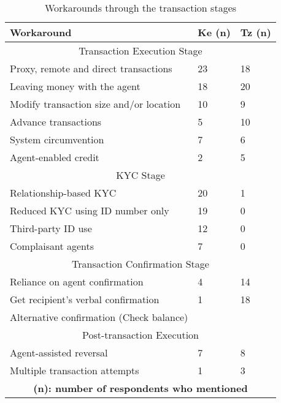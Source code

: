 \begin {table} [htbp]
\caption{Workarounds through the transaction stages}
\centering
\begin {tabular} {|l|l|l|}
\hline
\textbf{Workaround}& \textbf{Ke (n)}& \textbf{Tz (n)}\\
 \hline
 \hline
\multicolumn{3}{|c|}{Transaction Execution Stage}\\
\hline
Proxy, remote and direct transactions& 23& 18\\
Leaving money with the agent& 18& 20\\
Modify transaction size and/or location& 10& 9\\
Advance transactions& 5& 10\\
System circumvention& 7& 6\\
Agent-enabled credit& 2& 5\\
\hline
\multicolumn{3}{|c|}{KYC Stage} \\
\hline
Relationship-based KYC & 20& 1\\
Reduced KYC using ID number only& 19& 0\\
Third-party ID use& 12& 0\\
Complaisant agents& 7& 0\\
\hline
\multicolumn{3}{|c|}{Transaction Confirmation Stage}\\
\hline
Reliance on agent confirmation & 4& 14\\
Get recipient's verbal confirmation& 1& 18\\
Alternative confirmation (Check balance)& & \\
\hline
\multicolumn{3}{|c|}{Post-transaction Execution} \\
\hline
Agent-assisted reversal & 7& 8\\
Multiple transaction  attempts& 1& 3\\
\hline
\multicolumn{3}{|c|}{\textbf{(n): number of respondents who mentioned}} \\
\hline
 \end{tabular}
\label{table:tab1workarounds}
\end{table}

